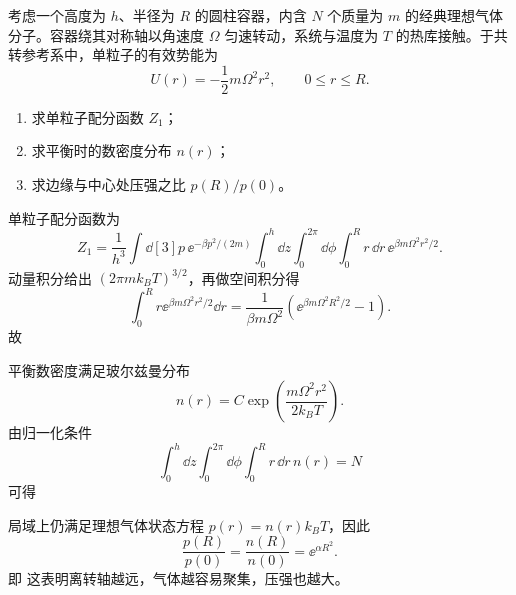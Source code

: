 \begin{question}
考虑一个高度为 $h$、半径为 $R$ 的圆柱容器，内含 $N$ 个质量为 $m$ 的经典理想气体分子。容器绕其对称轴以角速度 $\Omega$ 匀速转动，系统与温度为 $T$ 的热库接触。于共转参考系中，单粒子的有效势能为
\[
U(r)=-\frac12 m\Omega^2 r^2,
\qquad 0\le r\le R.
\]

\begin{enumerate}[label=(\arabic*),leftmargin=2.5em]
  \item 求单粒子配分函数 $Z_1$；
  \item 求平衡时的数密度分布 $n(r)$；
  \item 求边缘与中心处压强之比 $p(R)/p(0)$。
\end{enumerate}

\begin{solution}
单粒子配分函数为
\[
Z_1=\frac{1}{h^3}\int \dd[3]{p}\,\ee^{-\beta p^2/(2m)}\int_0^h \dd{z}\int_0^{2\pi}\dd{\phi}\int_0^R r\,\dd{r}\,\ee^{\beta m\Omega^2 r^2/2}.
\]
动量积分给出 $(2\pi m k_B T)^{3/2}$，再做空间积分得
\[
\int_0^R r \ee^{\beta m\Omega^2 r^2/2}\dd{r}
=\frac{1}{\beta m\Omega^2}\left(\ee^{\beta m\Omega^2 R^2/2}-1\right).
\]
故

平衡数密度满足玻尔兹曼分布
\[
n(r)=C\exp\left(\frac{m\Omega^2 r^2}{2k_B T}\right).
\]
由归一化条件
\[
\int_0^h \dd{z}\int_0^{2\pi}\dd{\phi}\int_0^R r\,\dd{r}\,n(r)=N
\]
可得

局域上仍满足理想气体状态方程 $p(r)=n(r)k_B T$，因此
\[
\frac{p(R)}{p(0)}=\frac{n(R)}{n(0)}=\ee^{\alpha R^2}.
\]
即
这表明离转轴越远，气体越容易聚集，压强也越大。
\end{solution}
\end{question}

